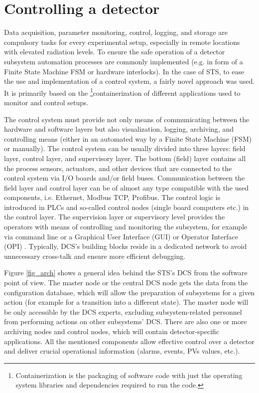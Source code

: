 \section{Controlling a detector}

Data acquisition, parameter monitoring, control, logging, and storage are compulsory tasks for every experimental setup, especially in remote locations with elevated radiation levels. To ensure the safe operation of a detector subsystem automation processes are commonly implemented (e.g. in form of a Finite State Machine \gls{FSM} or hardware interlocks). In the case of \gls{STS}, to ease the use and implementation of a control system, a fairly novel approach was used. It is primarily based on the \footnote{Containerization is the packaging of software code with just the operating system libraries and dependencies required to run the code.}{containerization} of different applications used to monitor and control setups. 

The control system must provide not only means of communicating between the hardware and software layers but also visualization, logging, archiving, and controlling means (either in an automated way by a Finite State Machine (\gls{FSM}) or manually). The control system can be usually divided into three layers: field layer, control layer, and supervisory layer. The bottom (field) layer contains all the process sensors, actuators, and other devices that are connected to the control system via I/O boards and/or field buses. Communication between the field layer and control layer can be of almost any type compatible with the used components, i.e. Ethernet, Modbus TCP, Profibus. The control logic is introduced in \glspl{PLC} and so-called control nodes (single board computers etc.) in the control layer. The supervision layer or supervisory level provides the operators with means of controlling and monitoring the subsystem, for example via command line or a Graphical User Interface (\gls{GUI}) or Operator Interface (\gls{OPI}) \cite{layers}.  Typically, DCS's building blocks reside in a dedicated network to avoid unnecessary cross-talk and ensure more efficient debugging.

Figure \ref{fig_arch} shows a general idea behind the \gls{STS}'s \gls{DCS} from the software point of view.  The master node or the central \gls{DCS} node gets the data from the configuration database, which will allow the preparation of subsystems for a given action (for example for a transition into a different state). The master node will be only accessible by the \gls{DCS} experts, excluding subsystem-related personnel from performing actions on other subsystems' \gls{DCS}. There are also one or more archiving nodes and control nodes, which will contain detector-specific applications. All the mentioned components allow effective control over a detector and deliver crucial operational information (alarms, events, \glspl{PV} values, etc.). 

